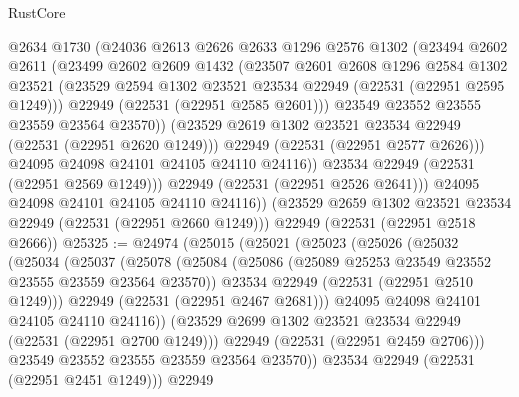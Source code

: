 \begin{lexlean}{RustCore}
\begin{coremodule}
                @2634
                @1730
                (@24036
                  @2613
                  @2626
                  @2633
                  @1296
                  @2576
                  @1302
                  (@23494
                    @2602
                    @2611
                    (@23499
                      @2602
                      @2609
                      @1432
                      (@23507
                        @2601
                        @2608
                        @1296
                        @2584
                        @1302
                        @23521
                        (@23529 @2594 @1302 @23521 @23534 @22949 (@22531 (@22951 @2595 @1249)))
                        @22949
                        (@22531 (@22951 @2585 @2601)))
                      @23549
                      @23552
                      @23555
                      @23559
                      @23564
                      @23570))
                  (@23529 @2619 @1302 @23521 @23534 @22949 (@22531 (@22951 @2620 @1249)))
                  @22949
                  (@22531 (@22951 @2577 @2626)))
                @24095
                @24098
                @24101
                @24105
                @24110
                @24116))
            @23534
            @22949
            (@22531 (@22951 @2569 @1249)))
          @22949
          (@22531 (@22951 @2526 @2641)))
        @24095
        @24098
        @24101
        @24105
        @24110
        @24116))
    (@23529 @2659 @1302 @23521 @23534 @22949 (@22531 (@22951 @2660 @1249)))
    @22949
    (@22531 (@22951 @2518 @2666))
@25325 := @24974
    (@25015
      (@25021
        (@25023
          (@25026
            (@25032
              (@25034
                (@25037
                  (@25078
                    (@25084
                      (@25086 (@25089 @25253 @23549 @23552 @23555 @23559 @23564 @23570))
                      @23534
                      @22949
                      (@22531 (@22951 @2510 @1249)))
                    @22949
                    (@22531 (@22951 @2467 @2681)))
                  @24095
                  @24098
                  @24101
                  @24105
                  @24110
                  @24116))
              (@23529 @2699 @1302 @23521 @23534 @22949 (@22531 (@22951 @2700 @1249)))
              @22949
              (@22531 (@22951 @2459 @2706)))
            @23549
            @23552
            @23555
            @23559
            @23564
            @23570))
        @23534
        @22949
        (@22531 (@22951 @2451 @1249)))
      @22949

\end{coremodule}
\end{lexlean}
